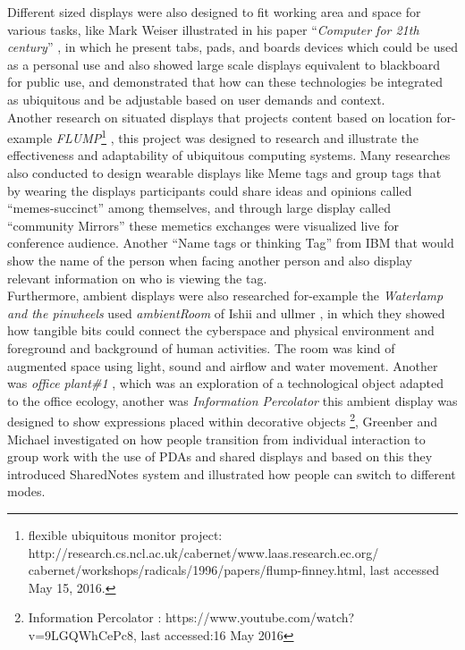 Different sized displays were also designed to fit working area and space for various tasks, like Mark Weiser illustrated in his paper ``\emph{Computer for 21th century}'' \cite{ newgenerationcomputer}, in which he present tabs, pads, and boards devices which could be used as a personal use and also showed large scale displays equivalent to blackboard for public use, and demonstrated that how can these technologies be integrated as ubiquitous and be adjustable based on user demands and context. \\

Another research on situated displays that projects content based on location for-example  \emph{FLUMP}\footnote{flexible ubiquitous monitor project: http://research.cs.ncl.ac.uk/cabernet/www.laas.research.ec.org/ \\ cabernet/workshops/radicals/1996/papers/flump-finney.html, last accessed May 15, 2016.} \cite{flump}, this project was designed to research and illustrate the effectiveness and adaptability of ubiquitous computing systems. Many researches also conducted to design wearable displays like Meme tags and group tags \cite{meme-tags} that by wearing the displays participants could share ideas and opinions called “memes-succinct” among themselves, and through large display called “community Mirrors” these memetics exchanges were visualized live for conference audience. Another “Name tags or thinking Tag” from IBM \cite{ibmtags} that would show the name of the person when facing another person and also display relevant information on who is viewing the tag.\\

Furthermore, ambient displays were also researched for-example the \emph{Waterlamp and the pinwheels} used \emph{ambientRoom} of Ishii and ullmer \cite{ambient}, in which they showed how tangible bits could connect the cyberspace and physical environment and foreground and background of human activities. The room was kind of augmented space using light, sound and airflow and water movement. Another was \emph{office plant\#1} \cite{office_plant}, which was an exploration of a technological object adapted to the office ecology, another was \emph{Information Percolator} \cite{information_precolator}  this ambient display was designed to show expressions placed within decorative objects \footnote{Information Percolator : https://www.youtube.com/watch?v=9LGQWhCePc8, last accessed:16 May 2016},  Greenber and Michael \cite{shared_notes} investigated on how people transition from individual interaction to group work with the use of PDAs and shared displays and based on this they introduced SharedNotes system and illustrated how people can switch to different modes.\\

